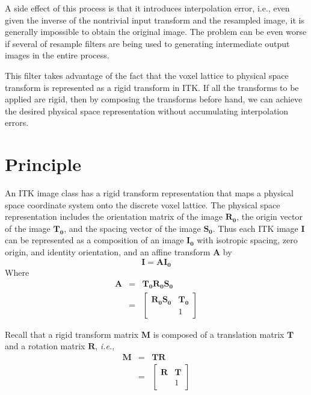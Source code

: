 \documentclass{InsightArticle}
\begin{document}
A side effect of this process is that it introduces interpolation error, i.e., even given the inverse of the nontrivial input transform and the resampled image, it is generally impossible to obtain the original image. The problem can be even worse if several of resample filters are being used to generating intermediate output images in the entire process.

This filter takes advantage of the fact that the voxel lattice to physical space transform is represented as a rigid transform in ITK.  If all the transforms to be applied are rigid, then by composing the transforms before hand, we can achieve the desired physical space representation without accumulating interpolation errors.

\section{Principle}

An ITK image class has a rigid transform representation that maps a physical space coordinate system onto the discrete voxel lattice. The physical space representation includes the orientation matrix of the image $\mathbf{R_0}$, the origin vector of the image $\mathbf{T_0}$, and the spacing vector of the image $\mathbf{S_0}$. Thus each ITK image $\mathbf{I}$ can be represented as a composition of an image $\mathbf{I_0}$ with isotropic spacing, zero origin, and identity orientation, and an affine transform $\mathbf{A}$ by
\begin{equation}
\mathbf{I} = \mathbf{A}\mathbf{I_0}
\end{equation}
Where
\begin{eqnarray}
\label{equ-A}
\mathbf{A} & = & \mathbf{T_0}\mathbf{R_0}\mathbf{S_0} \nonumber \\
& = &
\left[ {\begin{array}{cc}
\mathbf{R_0}\mathbf{S_0} & \mathbf{T_0} \\
 & 1
\end{array} } \right]
\end{eqnarray}

Recall that a rigid transform matrix $\mathbf{M}$ is composed of a translation matrix $\mathbf{T}$ and a rotation matrix $\mathbf{R}$, \textit{i.e.},
\begin{eqnarray}
\mathbf{M} & = & \mathbf{T}\mathbf{R} \nonumber \\
& = &
\left[ {\begin{array}{cc}
\mathbf{R} & \mathbf{T} \\
 & 1
\end{array} } \right]
\end{eqnarray}
\end{document}
